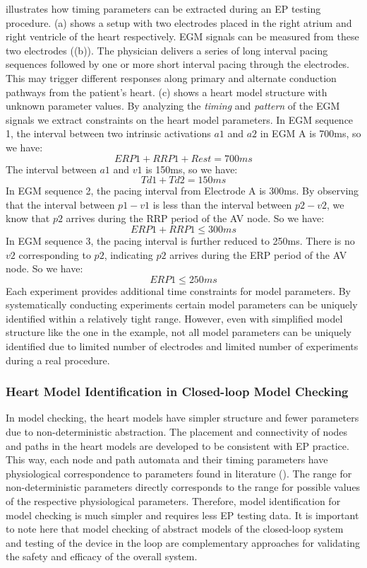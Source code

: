  illustrates how timing parameters can be extracted during an EP testing procedure. (a) shows a setup with two electrodes placed in the right atrium and right ventricle of the heart respectively. EGM signals can be measured from these two electrodes ((b)). The physician delivers a series of long interval pacing sequences followed by one or more short interval pacing through the electrodes. This may trigger different responses along primary and alternate conduction pathways from the patient's heart. (c) shows a heart model structure with unknown parameter values. By analyzing the \emph{timing} and \emph{pattern} of the EGM signals we extract constraints on the heart model parameters. In EGM sequence 1, the interval between two intrinsic activations $a1$ and $a2$ in EGM A is 700ms, so we have:
$$ERP1+RRP1+Rest=700ms$$
The interval between $a1$ and $v1$ is 150ms, so we have:
$$Td1+Td2=150ms$$
In EGM sequence 2, the pacing interval from Electrode A is 300ms. By observing that the interval between $p1-v1$ is less than the interval between $p2-v2$, we know that $p2$ arrives during the RRP period of the AV node. So we have:
$$ERP1+RRP1\leq 300ms$$
In EGM sequence 3, the pacing interval is further reduced to 250ms. There is no $v2$ corresponding to $p2$, indicating $p2$ arrives during the ERP period of the AV node. So we have:
$$ERP1\leq 250ms$$
Each experiment provides additional time constraints for model parameters. By systematically conducting experiments certain model parameters can be uniquely identified within a relatively tight range. However, even with simplified model structure like the one in the example, not all model parameters can be uniquely identified due to limited number of electrodes and limited number of experiments during a real procedure.






\subsubsection{Heart Model Identification in Closed-loop Model Checking}
In model checking, the heart models have simpler structure and fewer parameters due to non-deterministic abstraction. The placement and connectivity of nodes and paths in the heart models are developed to be consistent with EP practice. This way, each node and path automata and their timing parameters have physiological correspondence to parameters found in literature (). The range for non-deterministic parameters directly corresponds to the range for possible values of the respective physiological parameters. Therefore, model identification for model checking is much simpler and requires less EP testing data. It is important to note here that model checking of abstract models of the closed-loop system and testing of the device in the loop are complementary approaches for validating the safety and efficacy of the overall system. 

